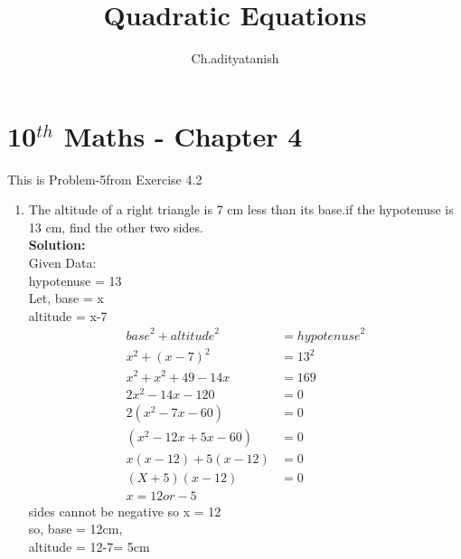 \documentclass[12pt]{article}
\newcommand{\solution}{\noindent \textbf{Solution: }}
\begin{document}
\title{Quadratic Equations}
\author{Ch.adityatanish} %
\maketitle
\section*{10$^{th}$ Maths - Chapter 4}
This is Problem-5from Exercise 4.2
\begin{enumerate}
\item The altitude of a right triangle is 7 cm less than its base.if the hypotenuse is 13 cm, find the other two sides.\\
\solution \\
Given Data:\\
hypotenuse = 13\\
Let,
base = x\\
altitude = x-7\\
\begin{align}
{base}^2 + {altitude}^2 &= {hypotenuse}^2\\
{x}^2 + {(x-7)}^2 &= {13}^2\\
{x}^2 + {x}^2 + {49}-{14x} &= {169}\\
2{x}^2- 14x- 120 &= 0\\
2({x}^2 - 7x - 60) &= 0\\
(x^2 - 12x + 5x - 60)&= 0\\
x(x-12) + 5(x-12) &= 0\\
(X+5)(x-12) &= 0\\
x=12 or -5
\end{align}
sides cannot be negative so x = 12\\
so, base = 12cm,\\
altitude = 12-7= 5cm\\

\end{enumerate}
\end{document}
